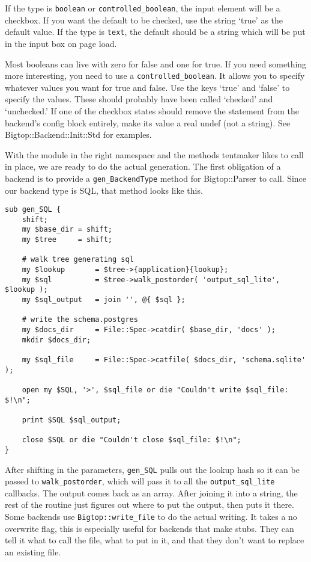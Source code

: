 If the type is \verb+boolean+ or \verb+controlled_boolean+, the input element
will be a checkbox.  If you want the default to be checked, use the string
`true' as the default value.  If the type is \verb+text+, the default should
be a string which will be put in the input box on page load.

Most booleans can live with zero for false and one for true.  If you need
something more interesting, you need to use a \verb+controlled_boolean+.
It allows you to specify whatever values you want for true and false.
Use the keys `true' and `false' to specify the values.  These should
probably have been called `checked' and `unchecked.'  If one of the checkbox
states should remove the statement from the backend's config block entirely,
make its value a real undef (not a string).  See Bigtop::Backend::Init::Std
for examples.

With the module in the right namespace and the methods tentmaker likes
to call in place, we are ready to do the actual generation.  The first
obligation of a backend is to provide a \verb+gen_BackendType+ method
for Bigtop::Parser to call.  Since our backend type is SQL, that method
looks like this.

\begin{verbatim}
sub gen_SQL {
    shift;
    my $base_dir = shift;
    my $tree     = shift;

    # walk tree generating sql
    my $lookup       = $tree->{application}{lookup};
    my $sql          = $tree->walk_postorder( 'output_sql_lite', $lookup );
    my $sql_output   = join '', @{ $sql };

    # write the schema.postgres
    my $docs_dir     = File::Spec->catdir( $base_dir, 'docs' );
    mkdir $docs_dir;

    my $sql_file     = File::Spec->catfile( $docs_dir, 'schema.sqlite' );

    open my $SQL, '>', $sql_file or die "Couldn't write $sql_file: $!\n";

    print $SQL $sql_output;

    close $SQL or die "Couldn't close $sql_file: $!\n";
}
\end{verbatim}

After shifting in the parameters, \verb+gen_SQL+ pulls out the lookup hash
so it can be passed to \verb+walk_postorder+, which will pass it to all
the \verb+output_sql_lite+ callbacks.  The output comes back as an
array.  After joining it into a string, the rest of the routine just
figures out where to put the output, then puts it there.  Some backends
use \verb+Bigtop::write_file+ to do the actual writing.  It takes a
no overwrite flag, this is especially useful for backends that make stubs.
They can tell it what to call the file, what to put in it, and that they
don't want to replace an existing file.

